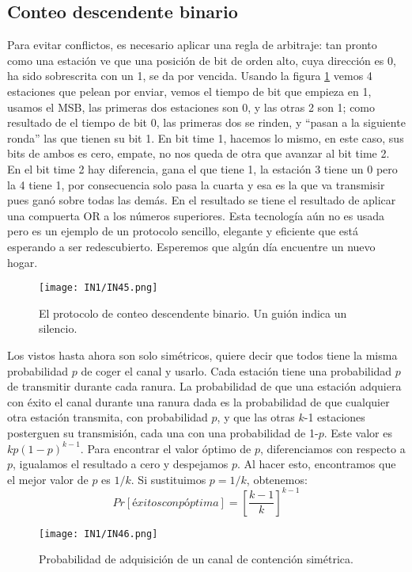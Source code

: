 \documentclass[
	12pt, %
	fleqn, %
	a4paper, %
]{LegrandOrangeBook}
\begin{document}
\subsection{Conteo descendente binario}
Para evitar conflictos, es necesario aplicar una regla de arbitraje: tan pronto como una estación ve que una posición de bit de orden alto, cuya dirección es 0, ha sido sobrescrita con un 1, se da por vencida. Usando la figura \ref{fig:conteo descendente} vemos 4 estaciones que pelean por enviar, vemos el tiempo de bit que empieza en 1, usamos el MSB, las primeras dos estaciones son 0, y las otras 2 son 1; como resultado de el tiempo de bit 0, las primeras dos se rinden, y ``pasan a  la siguiente ronda'' las que tienen su bit 1. En bit time 1, hacemos lo mismo, en este caso, sus bits de ambos es cero, empate, no nos queda de otra que avanzar al bit time 2. En el bit time 2 hay diferencia, gana el que tiene 1, la estación 3 tiene un 0 pero la 4 tiene 1, por consecuencia solo pasa la cuarta y esa es la que va transmisir pues ganó sobre todas las demás. En el resultado se tiene el resultado de aplicar una compuerta OR a los números superiores. Esta tecnología aún no es usada pero es un ejemplo de un protocolo sencillo, elegante y eficiente que está esperando a ser redescubierto. Esperemos que algún día encuentre un nuevo hogar.
\begin{figure}[H]
\centering
\texttt{[image: IN1/IN45.png]}
\caption{El protocolo de conteo descendente binario. Un guión indica un silencio.}
\label{fig:conteo descendente}
\end{figure}
Los vistos hasta ahora son solo simétricos, quiere decir que todos tiene la misma probabilidad $p$ de coger el canal y usarlo. Cada estación tiene una probabilidad $p$ de transmitir durante cada ranura. La probabilidad de que una estación adquiera con éxito el canal durante una ranura dada es la probabilidad de que cualquier otra estación transmita, con probabilidad $p$, y que las otras $k$-1 estaciones posterguen su transmisión, cada una con una probabilidad de 1-$p$. Este valor es $kp(1-p)^{k-1}$. Para encontrar el valor óptimo de $p$, diferenciamos con respecto a $p$, igualamos el resultado a cero y despejamos $p$. Al hacer esto, encontramos que el mejor valor de $p$ es $1/k$. Si sustituimos $p=1/k$, obtenemos:
\begin{equation}
Pr[éxitos con p óptima]=\left[\frac{k-1}{k}\right]^{k-1}
\end{equation}
\begin{figure}[H]
\centering
\texttt{[image: IN1/IN46.png]}
\caption{Probabilidad de adquisición de un canal de contención simétrica.}
\end{figure}
\end{document}

